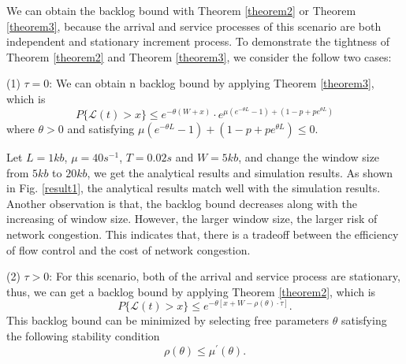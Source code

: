\documentclass[paper]{ieice}
\begin{document}
We can obtain the backlog bound with Theorem \ref{theorem2} or Theorem \ref{theorem3}, because the arrival and service processes of this scenario are both independent and stationary increment process. To demonstrate the tightness of Theorem \ref{theorem2} and Theorem \ref{theorem3}, we consider the follow two cases:

(1) $\tau=0$: We can obtain n backlog bound by applying Theorem \ref{theorem3}, which is
\begin{equation*}\label{equation3}
P\{\mathcal{L}(t)>x\}\leq e^{-\theta(W+x)}\cdot e^{\mu(e^{-\theta L}-1)+(1-p+pe^{\theta L})}
\end{equation*}
where $\theta>0$ and satisfying $\mu(e^{-\theta L}-1)+(1-p+pe^{\theta L})\leq 0$.

Let $L=1kb$, $\mu=40s^{-1}$, $T=0.02s$ and $W=5kb$, and change the window size from $5kb$ to $20kb$, we get the analytical results and simulation results. As shown in Fig. \ref{result1}, the analytical results match well with the simulation results. Another observation is that, the backlog bound decreases along with the increasing of window size. However, the larger window size, the larger risk of network congestion. This indicates that, there is a tradeoff between the efficiency of flow control and the cost of network congestion.

(2) $\tau> 0$: For this scenario, both of the arrival and service process are stationary, thus, we can get a backlog bound by applying Theorem \ref{theorem2}, which is
\begin{equation}\label{bernoullibound}
P\{\mathcal{L}(t)>x\}\leq e^{-\theta [x+W-\rho(\theta)\cdot \tau]}.
\end{equation}
This backlog bound can be minimized by selecting free parameters $\theta$ satisfying the following stability condition
\begin{equation}\label{stabilitycond3}
\rho(\theta)\leq \mu^\prime(\theta).
\end{equation}
\end{document}
